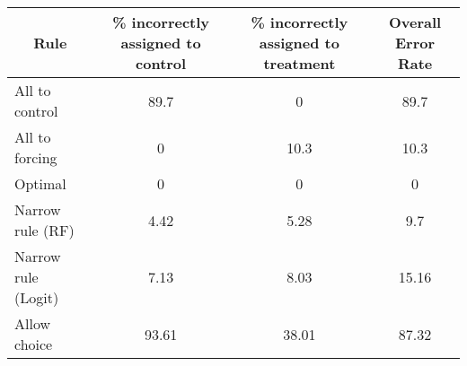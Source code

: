 \begin{tabular}{lccc}
\toprule
\multicolumn{1}{c}{Rule} & \% incorrectly assigned to control  & \% incorrectly assigned to treatment & Overall Error Rate \\
\midrule
\midrule
All to control & 89.7  & 0     & 89.7 \\
All to forcing & 0     & 10.3  & 10.3 \\
Optimal & 0     & 0     & 0 \\
Narrow rule (RF) & 4.42  & 5.28  & 9.7 \\
Narrow rule (Logit) & 7.13  & 8.03  & 15.16 \\
Allow choice & 93.61 & 38.01 & 87.32 \\
\bottomrule
\bottomrule
\end{tabular}%
